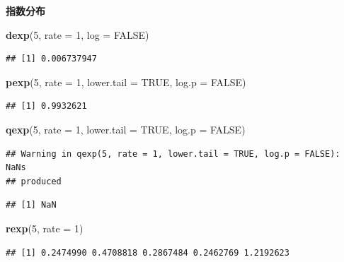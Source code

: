 \documentclass[]{article}
\newenvironment{Shaded}{\begin{snugshade}}{\end{snugshade}}
\newcommand{\KeywordTok}[1]{\textcolor[rgb]{0.13,0.29,0.53}{\textbf{{#1}}}}
\newcommand{\DataTypeTok}[1]{\textcolor[rgb]{0.13,0.29,0.53}{{#1}}}
\newcommand{\DecValTok}[1]{\textcolor[rgb]{0.00,0.00,0.81}{{#1}}}
\newcommand{\OtherTok}[1]{\textcolor[rgb]{0.56,0.35,0.01}{{#1}}}
\newcommand{\NormalTok}[1]{{#1}}
\begin{document}
\textbf{指数分布}

\begin{Shaded}
\begin{Highlighting}[]
\KeywordTok{dexp}\NormalTok{(}\DecValTok{5}\NormalTok{, }\DataTypeTok{rate =} \DecValTok{1}\NormalTok{, }\DataTypeTok{log =} \OtherTok{FALSE}\NormalTok{)}
\end{Highlighting}
\end{Shaded}

\begin{verbatim}
## [1] 0.006737947
\end{verbatim}

\begin{Shaded}
\begin{Highlighting}[]
\KeywordTok{pexp}\NormalTok{(}\DecValTok{5}\NormalTok{, }\DataTypeTok{rate =} \DecValTok{1}\NormalTok{, }\DataTypeTok{lower.tail =} \OtherTok{TRUE}\NormalTok{, }\DataTypeTok{log.p =} \OtherTok{FALSE}\NormalTok{)}
\end{Highlighting}
\end{Shaded}

\begin{verbatim}
## [1] 0.9932621
\end{verbatim}

\begin{Shaded}
\begin{Highlighting}[]
\KeywordTok{qexp}\NormalTok{(}\DecValTok{5}\NormalTok{, }\DataTypeTok{rate =} \DecValTok{1}\NormalTok{, }\DataTypeTok{lower.tail =} \OtherTok{TRUE}\NormalTok{, }\DataTypeTok{log.p =} \OtherTok{FALSE}\NormalTok{)}
\end{Highlighting}
\end{Shaded}

\begin{verbatim}
## Warning in qexp(5, rate = 1, lower.tail = TRUE, log.p = FALSE): NaNs
## produced
\end{verbatim}

\begin{verbatim}
## [1] NaN
\end{verbatim}

\begin{Shaded}
\begin{Highlighting}[]
\KeywordTok{rexp}\NormalTok{(}\DecValTok{5}\NormalTok{, }\DataTypeTok{rate =} \DecValTok{1}\NormalTok{)}
\end{Highlighting}
\end{Shaded}

\begin{verbatim}
## [1] 0.2474990 0.4708818 0.2867484 0.2462769 1.2192623
\end{verbatim}
\end{document}
